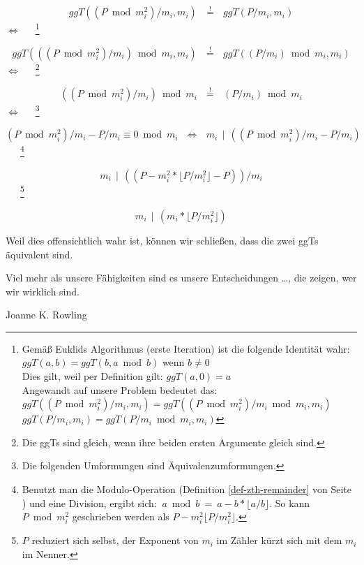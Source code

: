 \begin{refsegment}
$$ggT((P \bmod {m_{i}^{2}})/ m_{i}, m_{i})~~~  \overset{!}{=}  ~~~ggT( P / m_{i}, m_{i})$$
$ \Longleftrightarrow $~~~\footnote{Gemäß Euklids Algorithmus (erste Iteration) ist die folgende Identität wahr:\\
$ggT(a, b) = ggT(b, a \bmod b)$ wenn $ b \neq 0 $\\
Dies gilt, weil per Definition gilt: $ggT(a, 0) = a$\\
Angewandt auf unsere Problem bedeutet das:
\mbox{}\\
$ggT((P \bmod {m_{i}^{2}})/ m_{i}, m_{i})=ggT((P \bmod {m_{i}^{2}})/ m_{i} \bmod{m_{i}}, m_{i})$ \mbox{}\\
$ggT( P / m_{i}, m_{i})=ggT( P / m_{i} \bmod{m_{i}}, m_{i})$\mbox{}
}

$$ggT(((P \bmod {m_{i}^{2}})/ m_{i}) \bmod {m_{i}}, m_{i})~~~  \overset{!}{=}  ~~~ggT( (P / m_{i}) \bmod {m_{i}}, m_{i})$$
$ \Longleftrightarrow $~~~\footnote{Die ggTs sind gleich, wenn ihre beiden ersten Argumente gleich sind.
}

$$((P \bmod {m_{i}^{2}})/ m_{i}) \bmod {m_{i}}~~~  \overset{!}{=}  ~~~ (P / m_{i}) \bmod {m_{i}}$$
$ \Longleftrightarrow $~~~\footnote{Die folgenden Umformungen sind Äquivalenzumformungen.
}

$$(P \bmod{m_{i}^{2}})/ m_{i} - P / m_{i} \equiv 0   \bmod{m_{i}}~~~ \Leftrightarrow ~~~  m_{i} ~~ | ~~ ((P \bmod{m_{i}^{2}})/ m_{i} - P / m_{i})$$~~~\footnote{%
Benutzt man die Modulo-Operation (Definition \ref{def-zth-remainder} von Seite
\pageref{def-zth-remainder}) und eine Division, ergibt sich:
$~a \bmod{b} ~ =  ~ a - b * \lfloor a/b \rfloor$. So kann $P \bmod{m_{i}^{2}}$ geschrieben werden als $ P-m_{i}^{2} \lfloor P/m_{i}^{2} \rfloor$.
}

$$ m_{i} ~~ | ~~ ((P-m_{i}^{2}* \lfloor P/m_{i}^{2} \rfloor - P))/m_{i}$$~~~\footnote{%
$P$ reduziert sich selbst, der Exponent von $m_{i}$ im Zähler kürzt sich mit dem $m_{i}$ im Nenner.
}

$$ m_{i} ~~ | ~~ (m_{i}* \lfloor P/m_{i}^{2} \rfloor)$$

Weil dies offensichtlich wahr ist, können wir schließen, dass die zwei ggTs äquivalent sind.




\begin{ctsquote}
Viel mehr als unsere Fähigkeiten sind es
unsere Entscheidungen \dots, die zeigen, wer wir wirklich sind.
\caption[Joanne K. Rowling]{Joanne K. Rowling\footnotemark}
\end{ctsquote}


\end{refsegment}
